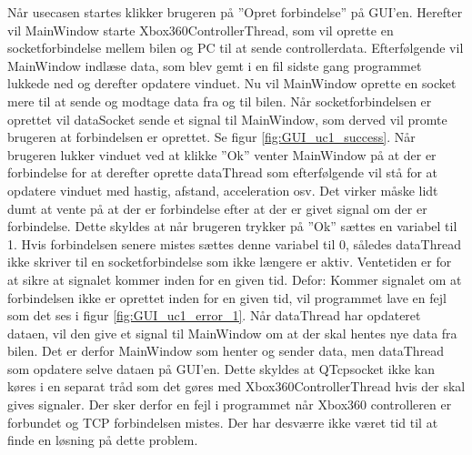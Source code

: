 Når usecasen startes klikker brugeren på ''Opret forbindelse'' på GUI'en. Herefter vil MainWindow starte Xbox360ControllerThread, som vil oprette en socketforbindelse mellem bilen og PC til at sende controllerdata. Efterfølgende vil MainWindow indlæse data, som blev gemt i en fil sidste gang programmet lukkede ned og derefter opdatere vinduet. Nu vil MainWindow oprette en socket mere til at sende og modtage data fra og til bilen. Når socketforbindelsen er oprettet vil dataSocket sende et signal til MainWindow, som derved vil promte brugeren at forbindelsen er oprettet. Se figur \ref{fig:GUI_uc1_success}. Når brugeren lukker vinduet ved at klikke ''Ok'' venter MainWindow på at der er forbindelse for at derefter oprette dataThread som efterfølgende vil stå for at opdatere vinduet med hastig, afstand, acceleration osv. Det virker måske lidt dumt at vente på at der er forbindelse efter at der er givet signal om der er forbindelse. Dette skyldes at når brugeren trykker på ''Ok'' sættes en variabel til 1. Hvis forbindelsen senere mistes sættes denne variabel til 0, således dataThread ikke skriver til en socketforbindelse som ikke længere er aktiv. Ventetiden er for at sikre at signalet kommer inden for en given tid. Defor: Kommer signalet om at forbindelsen ikke er oprettet inden for en given tid, vil programmet lave en fejl som det ses i figur \ref{fig:GUI_uc1_error_1}. Når dataThread har opdateret dataen, vil den give et signal til MainWindow om at der skal hentes nye data fra bilen. Det er derfor MainWindow som henter og sender data, men dataThread som opdatere selve dataen på GUI'en. Dette skyldes at QTcpsocket ikke kan køres i en separat tråd som det gøres med Xbox360ControllerThread hvis der skal gives signaler. Der sker derfor en fejl i programmet når Xbox360 controlleren er forbundet og TCP forbindelsen mistes. Der har desværre ikke været tid til at finde en løsning på dette problem.  


